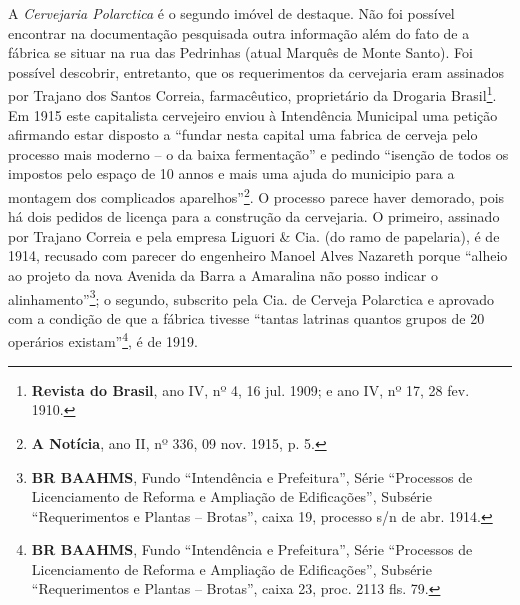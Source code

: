 A \textit{Cervejaria Polarctica} é o segundo imóvel de destaque. Não foi possível encontrar na documentação pesquisada outra informação além do fato de a fábrica se situar na rua das Pedrinhas (atual Marquês de Monte Santo). Foi possível descobrir, entretanto, que os requerimentos da cervejaria eram assinados por Trajano dos Santos Correia, farmacêutico, proprietário da Drogaria Brasil\footnote{\textbf{Revista do Brasil}, ano IV, nº 4, 16 jul. 1909; e ano IV, nº 17, 28 fev. 1910.}. Em 1915 este capitalista cervejeiro enviou à Intendência Municipal uma petição afirmando estar disposto a ``fundar nesta capital uma fabrica de cerveja pelo processo mais moderno -- o da baixa fermentação'' e pedindo ``isenção de todos os impostos pelo espaço de 10 annos e mais uma ajuda do municipio para a montagem dos complicados aparelhos''\footnote{\textbf{A Notícia}, ano II, nº 336, 09 nov. 1915, p. 5.}. O processo parece haver demorado, pois há dois pedidos de licença para a construção da cervejaria. O primeiro, assinado por Trajano Correia e pela empresa Liguori \& Cia. (do ramo de papelaria), é de 1914, recusado com parecer do engenheiro Manoel Alves Nazareth porque ``alheio ao projeto da nova Avenida da Barra a Amaralina não posso indicar o alinhamento''\footnote{\textbf{BR BAAHMS}, Fundo ``Intendência e Prefeitura'', Série ``Processos de Licenciamento de Reforma e Ampliação de Edificações'', Subsérie ``Requerimentos e Plantas -- Brotas'', caixa 19, processo s/n de abr. 1914.}; o segundo, subscrito pela Cia. de Cerveja Polarctica e aprovado com a condição de que a fábrica tivesse ``tantas latrinas quantos grupos de 20 operários existam''\footnote{\textbf{BR BAAHMS}, Fundo ``Intendência e Prefeitura'', Série ``Processos de Licenciamento de Reforma e Ampliação de Edificações'', Subsérie ``Requerimentos e Plantas -- Brotas'', caixa 23, proc. 2113 fls. 79.}, é de 1919.

